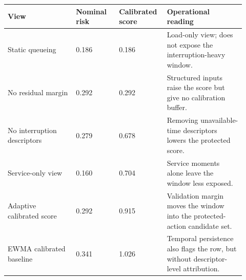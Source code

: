 \begin{tabular}{p{0.27\linewidth}p{0.17\linewidth}p{0.17\linewidth}p{0.31\linewidth}}
\toprule
View & Nominal risk & Calibrated score & Operational reading \\
\midrule
Static queueing & 0.186 & 0.186 & Load-only view; does not expose the interruption-heavy window. \\
No residual margin & 0.292 & 0.292 & Structured inputs raise the score but give no calibration buffer. \\
No interruption descriptors & 0.279 & 0.678 & Removing unavailable-time descriptors lowers the protected score. \\
Service-only view & 0.160 & 0.704 & Service moments alone leave the window less exposed. \\
Adaptive calibrated score & 0.292 & 0.915 & Validation margin moves the window into the protected-action candidate set. \\
EWMA calibrated baseline & 0.341 & 1.026 & Temporal persistence also flags the row, but without descriptor-level attribution. \\
\bottomrule
\end{tabular}
